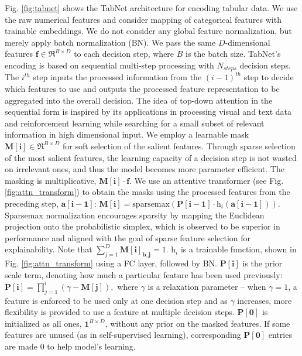 Fig. \ref{fig:tabnet} shows the TabNet architecture for encoding tabular data. 
We use the raw numerical features and consider mapping of categorical features with trainable embeddings.
We do not consider any global feature normalization, but merely apply batch normalization (BN). 
We pass the same $D$-dimensional features $\mathbf{f} \in \Re ^ {B \times D}$ to each decision step, where $B$ is the batch size. 
TabNet's encoding is based on sequential multi-step processing with $N_{steps}$ decision steps. 
The $i^{th}$ step inputs the processed information from the $(i-1)^{th}$ step to decide which features to use and outputs the processed feature representation to be aggregated into the overall decision. 
The idea of top-down attention in the sequential form is inspired by its applications in processing visual and text data \citep{compositional_attention} and reinforcement learning \citep{S3A} while searching for a small subset of relevant information in high dimensional input. 
\noindent{}
We employ a learnable mask $\mathbf{M[i]} \in \Re ^ {B \times D}$ for soft selection of the salient features. Through sparse selection of the most salient features, the learning capacity of a decision step is not wasted on irrelevant ones, and thus the model becomes more parameter efficient. The masking is multiplicative, $\mathbf{M[i]} \cdot \mathbf{f}$. We use an attentive transformer (see Fig. \ref{fig:attn_transform}) to obtain the masks using the processed features from the preceding step, $\mathbf{a[i-1]}$:
$
\mathbf{M[i]} = \text{sparsemax}(\mathbf{P[i-1]} \cdot \text{h}_i(\mathbf{a[i-1]})).
$
Sparsemax normalization \citep{sparsemax} encourages sparsity by mapping the Euclidean projection onto the probabilistic simplex, which is observed to be superior in performance and aligned with the goal of sparse feature selection for explainability. Note that $\sum\nolimits_{j=1}^{D} \mathbf{M[i]_{b,j}} = 1$. $\text{h}_i$ is a trainable function, shown in Fig. \ref{fig:attn_transform} using a FC layer, followed by BN. $\mathbf{P[i]}$ is the prior scale term, denoting how much a particular feature has been used previously:
$
\mathbf{P[i]} = \prod\nolimits_{j=1}^{i} (\gamma - \mathbf{M[j]}), 
$
where $\gamma$ is a relaxation parameter -- when $\gamma=1$, a feature is enforced to be used only at one decision step and as $\gamma$ increases, more flexibility is provided to use a feature at multiple decision steps. $\mathbf{P[0]}$ is initialized as all ones, $\mathbf{1} ^ {B \times D}$, without any prior on the masked features. If some features are unused (as in self-supervised learning), corresponding $\mathbf{P[0]}$ entries are made 0 to help model's learning.
